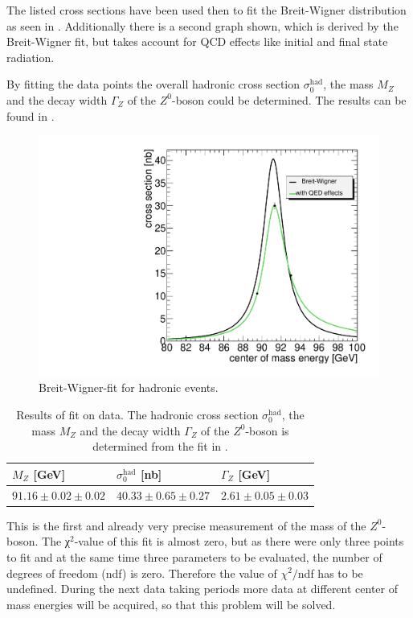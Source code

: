 \documentclass[epj,nopacs]{svjour}
\begin{document}
The listed cross sections have been used then to fit the Breit-Wigner distribution as
seen in . Additionally there is a second graph shown, which
is derived by the Breit-Wigner fit, but takes account for QCD effects like
initial and final state radiation.

By fitting the data
points the overall hadronic cross section $σ_0^{\mathrm{had}}$, the mass $M_Z$
and the decay width $Γ_Z$ of the $Z^0$-boson could be determined. The results
can be found in .

\begin{figure}[htb]
 \centering
 \includegraphics[width=1\columnwidth,keepaspectratio]{finalhad_fit}
 \caption{Breit-Wigner-fit for hadronic events.}
 \label{fig:fit_hadrons}
\end{figure}

\begin{table}[h]
\begin{center}
\begin{tabular}{|l|l|l|}
\hline
$M_Z$ [\si{\GeV}] & $σ_0^{\mathrm{had}}$  [\si{\nano\barn}] & $Γ_Z$
[\si{\GeV}]\\
\hline
$91.16 \pm 0.02 \pm 0.02$ & $40.33 \pm 0.65 \pm 0.27$ & $2.61 \pm 0.05 \pm 0.03$\\
\hline
\end{tabular}
\vspace*{0.3cm}
\caption{\baselineskip=0.38cm Results of fit on data. The hadronic cross section
$σ_0^{\mathrm{had}}$, the mass $M_Z$ and the decay width $Γ_Z$ of the
$Z^0$-boson is determined from the fit in .}
\label{tab:results}
\end{center}
\vspace*{-0.5cm}
\end{table}
This is the first and already very precise measurement of the mass of the $Z^0$-boson. 
The χ$^2$-value of this fit is almost zero, but as there were only three points
to fit and at the same time three parameters to be evaluated, the
number of degrees of freedom (ndf) is zero. Therefore the value of $χ^2/$ndf has to be
undefined. During the next data taking periods more data at different center of
mass energies will be acquired, so that this problem will be solved.
\end{document}
